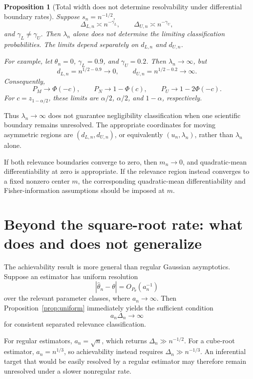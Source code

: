 \documentclass[11pt]{article}
\newtheorem{proposition}{Proposition}
\theoremstyle{remark}
\begin{document}
\begin{proposition}[Total width does not determine resolvability under differential boundary rates]
\label{prop:asym}
Suppose $s_n=n^{-1/2}$,
\[
\Delta_{L,n}\asymp n^{-\gamma_L},
\qquad
\Delta_{U,n}\asymp n^{-\gamma_U},
\]
and $\gamma_L\ne\gamma_U$. Then $\lambda_n$ alone does not determine the limiting classification probabilities. The limits depend separately on $d_{L,n}$ and $d_{U,n}$.

For example, let $\theta_n=0$, $\gamma_L=0.9$, and $\gamma_U=0.2$. Then $\lambda_n\to\infty$, but
\[
d_{L,n}=n^{1/2-0.9}\to0,
\qquad
d_{U,n}=n^{1/2-0.2}\to\infty.
\]
Consequently,
\[
P_M\to\Phi(-c),
\qquad
P_N\to1-\Phi(c),
\qquad
P_U\to1-2\Phi(-c).
\]
For $c=z_{1-\alpha/2}$, these limits are $\alpha/2$, $\alpha/2$, and $1-\alpha$, respectively.
\end{proposition}

Thus $\lambda_n\to\infty$ does not guarantee negligibility classification when one scientific boundary remains unresolved. The appropriate coordinates for moving asymmetric regions are $(d_{L,n},d_{U,n})$, or equivalently $(u_n,\lambda_n)$, rather than $\lambda_n$ alone.

If both relevance boundaries converge to zero, then $m_n\to0$, and quadratic-mean differentiability at zero is appropriate. If the relevance region instead converges to a fixed nonzero center $m$, the corresponding quadratic-mean differentiability and Fisher-information assumptions should be imposed at $m$.

\section{Beyond the square-root rate: what does and does not generalize}

The achievability result is more general than regular Gaussian asymptotics. Suppose an estimator has uniform resolution
\[
|\hat\theta_n-\theta|=O_{P_\theta}(a_n^{-1})
\]
over the relevant parameter classes, where $a_n\to\infty$. Then Proposition~\ref{prop:uniform} immediately yields the sufficient condition
\begin{equation}
a_n\Delta_n\to\infty
\label{eq:generalrate}
\end{equation}
for consistent separated relevance classification.

For regular estimators, $a_n=\sqrt n$, which returns $\Delta_n\gg n^{-1/2}$. For a cube-root estimator, $a_n=n^{1/3}$, so achievability instead requires $\Delta_n\gg n^{-1/3}$. An inferential target that would be easily resolved by a regular estimator may therefore remain unresolved under a slower nonregular rate.
\end{document}
